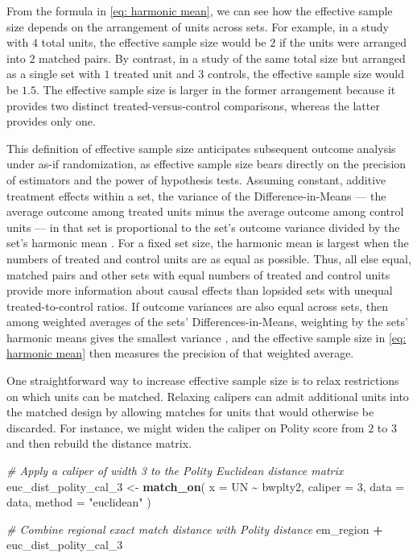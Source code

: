\documentclass[
  12pt,
  leqno]{article}
\newenvironment{Shaded}{\begin{snugshade}}{\end{snugshade}}
\newcommand{\AttributeTok}[1]{\textcolor[rgb]{0.13,0.29,0.53}{#1}}
\newcommand{\CommentTok}[1]{\textcolor[rgb]{0.56,0.35,0.01}{\textit{#1}}}
\newcommand{\DecValTok}[1]{\textcolor[rgb]{0.00,0.00,0.81}{#1}}
\newcommand{\FunctionTok}[1]{\textcolor[rgb]{0.13,0.29,0.53}{\textbf{#1}}}
\newcommand{\NormalTok}[1]{#1}
\newcommand{\OtherTok}[1]{\textcolor[rgb]{0.56,0.35,0.01}{#1}}
\newcommand{\SpecialCharTok}[1]{\textcolor[rgb]{0.81,0.36,0.00}{\textbf{#1}}}
\newcommand{\StringTok}[1]{\textcolor[rgb]{0.31,0.60,0.02}{#1}}
\begin{document}
From the formula in \eqref{eq: harmonic mean}, we can see how the
effective sample size depends on the arrangement of units across sets.
For example, in a study with \(4\) total units, the effective sample
size would be \(2\) if the units were arranged into \(2\) matched pairs.
By contrast, in a study of the same total size but arranged as a single
set with \(1\) treated unit and \(3\) controls, the effective sample
size would be \(1.5\). The effective sample size is larger in the former
arrangement because it provides two distinct treated-versus-control
comparisons, whereas the latter provides only one.

This definition of effective sample size anticipates subsequent outcome
analysis under as-if randomization, as effective sample size bears
directly on the precision of estimators and the power of hypothesis
tests. Assuming constant, additive treatment effects within a set, the
variance of the Difference-in-Means --- the average outcome among
treated units minus the average outcome among control units --- in that
set is proportional to the set's outcome variance divided by the set's
harmonic mean \citep{hansenbowers2008, hansen2011}. For a fixed set
size, the harmonic mean is largest when the numbers of treated and
control units are as equal as possible. Thus, all else equal, matched
pairs and other sets with equal numbers of treated and control units
provide more information about causal effects than lopsided sets with
unequal treated-to-control ratios. If outcome variances are also equal
across sets, then among weighted averages of the sets'
Differences-in-Means, weighting by the sets' harmonic means gives the
smallest variance \citep[p.~164, fn. 3]{hansen2011}, and the effective
sample size in \eqref{eq: harmonic mean} then measures the precision of
that weighted average.

One straightforward way to increase effective sample size is to relax
restrictions on which units can be matched. Relaxing calipers can admit
additional units into the matched design by allowing matches for units
that would otherwise be discarded. For instance, we might widen the
caliper on Polity score from \(2\) to \(3\) and then rebuild the
distance matrix.

\singlespacing

\begin{Shaded}
\begin{Highlighting}[]
\CommentTok{\# Apply a caliper of width 3 to the Polity Euclidean distance matrix}
\NormalTok{euc\_dist\_polity\_cal\_3 }\OtherTok{\textless{}{-}} \FunctionTok{match\_on}\NormalTok{(}
  \AttributeTok{x =}\NormalTok{ UN }\SpecialCharTok{\textasciitilde{}}\NormalTok{ bwplty2,}
  \AttributeTok{caliper =} \DecValTok{3}\NormalTok{,}
  \AttributeTok{data =}\NormalTok{ data,}
  \AttributeTok{method =} \StringTok{"euclidean"}
\NormalTok{)}

\CommentTok{\# Combine regional exact match distance with Polity distance}
\NormalTok{em\_region }\SpecialCharTok{+}\NormalTok{ euc\_dist\_polity\_cal\_3}
\end{Highlighting}
\end{Shaded}
\end{document}
